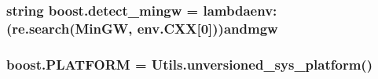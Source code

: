 \subsubsection[{\texorpdfstring{detect\+\_\+mingw}{detect_mingw}}]{\setlength{\rightskip}{0pt plus 5cm}string boost.\+detect\+\_\+mingw = lambdaenv\+:(re.\+search(\textquotesingle{}Min\+GW\textquotesingle{}, env.\+C\+XX\mbox{[}0\mbox{]}))and\textquotesingle{}mgw\textquotesingle{}}\hypertarget{namespaceboost_ab9cba3cb197b1cb5ed3dee4ce6f3bc69}{}\label{namespaceboost_ab9cba3cb197b1cb5ed3dee4ce6f3bc69}
\subsubsection[{\texorpdfstring{P\+L\+A\+T\+F\+O\+RM}{PLATFORM}}]{\setlength{\rightskip}{0pt plus 5cm}boost.\+P\+L\+A\+T\+F\+O\+RM = Utils.\+unversioned\+\_\+sys\+\_\+platform()}\hypertarget{namespaceboost_a62c954028d3e79409e93dfeae1d32ecb}{}\label{namespaceboost_a62c954028d3e79409e93dfeae1d32ecb}
